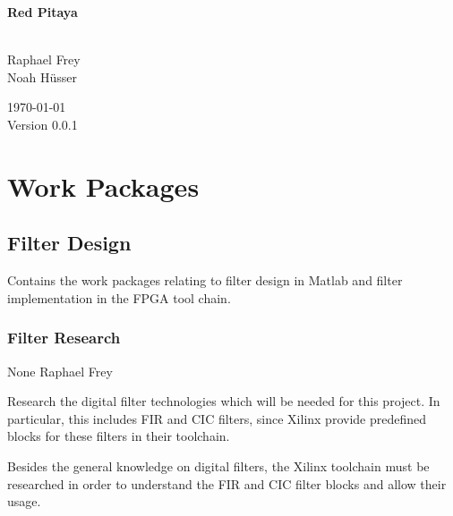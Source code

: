 \documentclass[a4paper,oneside]{alpenspecs/alpenspecs}
\begin{document}
\begin{titlingpage} %
    \flushright\sffamily

    \vspace*{5em}
    \Huge\bfseries{Red Pitaya}\\[1ex]
    \Large{}\\[3ex]

    \normalsize\mdseries

    \vfill
    Raphael Frey\\
    Noah H\"usser\\[3ex]

    \vspace{5em}

    \today\\
    Version 0.0.1
\end{titlingpage} %

\frontmatter %
\tableofcontents*

\mainmatter

\chapter{Work Packages} %
\label{ch:wpac}


\section{Filter Design}
\label{sec:filters}

Contains the  work packages  relating to  filter design  in Matlab  and filter
implementation in the FPGA tool chain.

\subsection{Filter Research}
\label{subsec:filter:research}

\wpac
     {}
     {}
     {}
     {None}
     {}
     {Raphael Frey}
     {%
         Research the digital filter technologies which will be needed for this
         project. In particular, this includes FIR and CIC filters, since Xilinx
         provide predefined blocks for these filters in their toolchain.

         Besides the general knowledge on digital filters, the Xilinx toolchain
         must be researched in order to understand the FIR and CIC filter blocks
         and allow their usage.
     }
\end{document}

